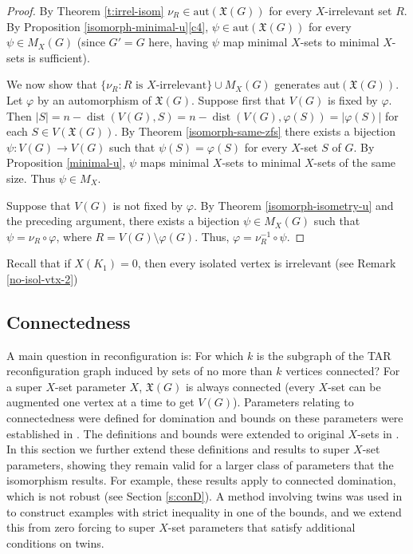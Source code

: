 \documentclass{article}
\def\blu{\color{blue}}
\numberwithin{figure}{section}
\numberwithin{table}{section}
\numberwithin{equation}{section}
\theoremstyle{definition}
\theoremstyle{definition}
\theoremstyle{definition}
\newcommand{\bpf}{\begin{proof}}
\newcommand{\epf}{\end{proof}\ms}
\newcommand{\ms}{\medskip}
\newcommand{\noi}{\noindent}
\newcommand{\Xr}{X}
\newcommand{\xtar}{\mathfrak{X}}%
\newcommand{\xrtar}{\mathfrak{X}}%
\newcommand{\dist}{\operatorname{dist}}
\begin{document}
{{\blu
\noi{\bf Proof of Theorem \ref{t:auto-univ}:}
\bpf 
By Theorem \ref{t:irrel-isom} $\nu_R\in\text{aut}(\xrtar(G))$ for every $X$-irrelevant set $R$. 
 By Proposition \ref{isomorph-minimal-u}\eqref{c4}, $\psi\in\text{aut}(\xrtar(G))$ for every  $\psi\in M_{\Xr}(G)$ (since $G'=G$ here, having $\psi$ map minimal $\Xr$-sets to minimal $\Xr$-sets is sufficient). 
 
We now show that $\{\nu_R : R\text{ is $\Xr$-irrelevant}\}\cup M_{\Xr}(G)$ generates aut$(\xrtar(G))$. Let $\varphi$ by an automorphism of $\xrtar(G)$. Suppose first that $V(G)$ is fixed by $\varphi$. Then   $|S|=n-\dist(V(G),S)=n-\dist(V(G),\varphi(S))=|\varphi(S)|$  for each $S\in V(\xrtar(G))$.   By Theorem \ref{isomorph-same-zfs} there exists a bijection $\psi:V(G)\to V(G)$ such that $\psi(S) = \varphi(S)$ for every $\Xr$-set $S$ of $G$.  By  Proposition \ref{minimal-u}, $\psi$ maps minimal $\Xr$-sets to minimal $\Xr$-sets of the same size.  Thus $\psi\in M_{\Xr}$.

Suppose that $V(G)$ is not fixed by $\varphi$. By Theorem \ref{isomorph-isometry-u} and the preceding argument, there exists a bijection $\psi\in M_{\Xr}(G)$ such that $\psi = \nu_{R}\circ\varphi$, where $R=V(G)\setminus \varphi(G)$. Thus, $\varphi = \nu_R^{-1}\circ\psi$.
\epf
}

 Recall that if $X(K_1)=0$, then every isolated vertex is irrelevant (see Remark \ref{no-isol-vtx-2})
\subsection{Connectedness}\label{ss:Xconn}

 A main question in reconfiguration is: For which $k$ is the subgraph of the TAR reconfiguration graph induced by sets of no more than $k$ vertices  connected?  For a super $X$-set parameter $X$, $\xtar (G)$ is always connected (every $X$-set can be augmented one vertex at a time to get $V(G)$).  
 Parameters relating to connectedness were defined for domination and bounds on these parameters were established in \cite{HS14}. The definitions and bounds were extended to original $X$-sets in \cite{PDrecon}. 
 In this section we  further extend  these definitions and results   to  super  $X$-set parameters, showing they remain valid for a larger class of parameters that the isomorphism results. For example, these results apply to connected domination,  which is not robust (see  Section \ref{s:conD}).  
 A method involving twins was used in \cite{XTARiso} to construct examples  with strict inequality in one of the bounds, and we extend this from zero forcing to super $X$-set parameters that satisfy additional conditions on twins.






}
\end{document}
